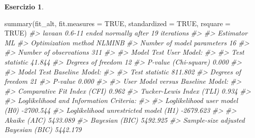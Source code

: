 \documentclass[
  11pt,
]{krantz}
\makeatletter
\newenvironment{Shaded}{\begin{snugshade}}{\end{snugshade}}
\newcommand{\AttributeTok}[1]{\textcolor[rgb]{0.61,0.61,0.61}{#1}}
\newcommand{\CommentTok}[1]{\textcolor[rgb]{0.37,0.37,0.37}{\textit{#1}}}
\newcommand{\ConstantTok}[1]{\textcolor[rgb]{0,0,0}{#1}}
\newcommand{\FunctionTok}[1]{\textcolor[rgb]{0,0,0}{#1}}
\newcommand{\NormalTok}[1]{#1}
\newenvironment{kframe}{%
\medskip{}
\setlength{\fboxsep}{.8em}
 \def\at@end@of@kframe{}%
 \ifinner\ifhmode%
  \def\at@end@of@kframe{\end{minipage}}%
  \begin{minipage}{\columnwidth}%
 \fi\fi%
 \def\FrameCommand##1{\hskip\@totalleftmargin \hskip-\fboxsep
 \colorbox{shadecolor}{##1}\hskip-\fboxsep
     \hskip-\linewidth \hskip-\@totalleftmargin \hskip\columnwidth}%
 \MakeFramed {\advance\hsize-\width
   \@totalleftmargin\z@ \linewidth\hsize
   \@setminipage}}%
 {\par\unskip\endMakeFramed%
 \at@end@of@kframe}
\renewenvironment{Shaded}{\begin{kframe}}{\end{kframe}}
\theoremstyle{definition}
\theoremstyle{definition}
\theoremstyle{definition}
\newtheorem{exercise}{Esercizio}[chapter]
\theoremstyle{definition}
\theoremstyle{remark}
\makeatother
\begin{document}
\begin{exercise}
\begin{Shaded}
\begin{Highlighting}[]
\FunctionTok{summary}\NormalTok{(fit\_alt, }\AttributeTok{fit.measures =} \ConstantTok{TRUE}\NormalTok{, }\AttributeTok{standardized =} \ConstantTok{TRUE}\NormalTok{, }\AttributeTok{rsquare =} \ConstantTok{TRUE}\NormalTok{)}
\CommentTok{\#\textgreater{} lavaan 0.6{-}11 ended normally after 19 iterations}
\CommentTok{\#\textgreater{} }
\CommentTok{\#\textgreater{}   Estimator                                         ML}
\CommentTok{\#\textgreater{}   Optimization method                           NLMINB}
\CommentTok{\#\textgreater{}   Number of model parameters                        16}
\CommentTok{\#\textgreater{}                                                       }
\CommentTok{\#\textgreater{}   Number of observations                           311}
\CommentTok{\#\textgreater{}                                                       }
\CommentTok{\#\textgreater{} Model Test User Model:}
\CommentTok{\#\textgreater{}                                                       }
\CommentTok{\#\textgreater{}   Test statistic                                41.844}
\CommentTok{\#\textgreater{}   Degrees of freedom                                12}
\CommentTok{\#\textgreater{}   P{-}value (Chi{-}square)                           0.000}
\CommentTok{\#\textgreater{} }
\CommentTok{\#\textgreater{} Model Test Baseline Model:}
\CommentTok{\#\textgreater{} }
\CommentTok{\#\textgreater{}   Test statistic                               811.802}
\CommentTok{\#\textgreater{}   Degrees of freedom                                21}
\CommentTok{\#\textgreater{}   P{-}value                                        0.000}
\CommentTok{\#\textgreater{} }
\CommentTok{\#\textgreater{} User Model versus Baseline Model:}
\CommentTok{\#\textgreater{} }
\CommentTok{\#\textgreater{}   Comparative Fit Index (CFI)                    0.962}
\CommentTok{\#\textgreater{}   Tucker{-}Lewis Index (TLI)                       0.934}
\CommentTok{\#\textgreater{} }
\CommentTok{\#\textgreater{} Loglikelihood and Information Criteria:}
\CommentTok{\#\textgreater{} }
\CommentTok{\#\textgreater{}   Loglikelihood user model (H0)              {-}2700.544}
\CommentTok{\#\textgreater{}   Loglikelihood unrestricted model (H1)      {-}2679.623}
\CommentTok{\#\textgreater{}                                                       }
\CommentTok{\#\textgreater{}   Akaike (AIC)                                5433.089}
\CommentTok{\#\textgreater{}   Bayesian (BIC)                              5492.925}
\CommentTok{\#\textgreater{}   Sample{-}size adjusted Bayesian (BIC)         5442.179}

\end{Highlighting}
\end{Shaded}
\end{exercise}
\end{document}
